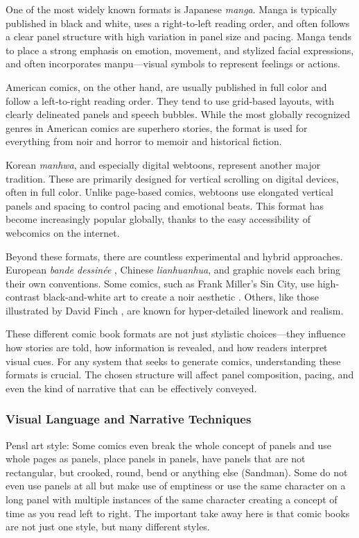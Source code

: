 One of the most widely known formats is Japanese \textit{manga}. Manga is typically published in black and white, uses a right-to-left reading order, and often follows a clear panel structure with high variation in panel size and pacing. Manga tends to place a strong emphasis on emotion, movement, and stylized facial expressions, and often incorporates manpu—visual symbols to represent feelings or actions.

American comics, on the other hand, are usually published in full color and follow a left-to-right reading order. They tend to use grid-based layouts, with clearly delineated panels and speech bubbles. While the most globally recognized genres in American comics are superhero stories, the format is used for everything from noir and horror to memoir and historical fiction.

Korean \textit{manhwa}, and especially digital webtoons, represent another major tradition. These are primarily designed for vertical scrolling on digital devices, often in full color. Unlike page-based comics, webtoons use elongated vertical panels and spacing to control pacing and emotional beats. This format has become increasingly popular globally, thanks to the easy accessibility of webcomics on the internet.

Beyond these formats, there are countless experimental and hybrid approaches. European \textit{bande dessinée} , Chinese \textit{lianhuanhua}, and graphic novels each bring their own conventions. Some comics, such as Frank Miller's Sin City, use high-contrast black-and-white art to create a noir aesthetic \cite{miller1991sincity}. Others, like those illustrated by David Finch \cite{finch2024portfolio}, are known for hyper-detailed linework and realism.

These different comic book formats are not just stylistic choices—they influence how stories are told, how information is revealed, and how readers interpret visual cues. For any system that seeks to generate comics, understanding these formats is crucial. The chosen structure will affect panel composition, pacing, and even the kind of narrative that can be effectively conveyed.

\subsubsection{Visual Language and Narrative Techniques}
Pensl art style: Some comics even break the whole concept of panels and use whole pages as panels, place panels in panels, have panels that are not rectangular, but crooked, round, bend or anything else (Sandman). Some do not even use panels at all but make use of emptiness or use the same character on a long panel with multiple instances of the same character creating a concept of time as you read left to right. The important take away here is that comic books are not just one style, but many different styles.

